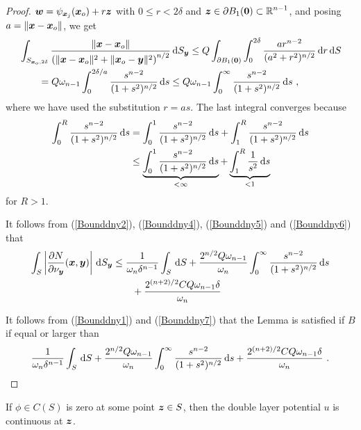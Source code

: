 \begin{proof}
${\bm{w}} = \psi_{{\bm{x}}_j}({\bm{x}}_o) + r {\bm{z}}$ with $0 \leq r < 2\delta$
and $\displaystyle {\bm{z}} \in \partial B_1({\bm{0}}) \subset \mathbb{R}^{n-1}$,
and posing $a = \|{\bm{x}}-{\bm{x}}_o\|$, we get
\begin{align}
&\int_{S_{{\bm{x}}_o,2\delta}}
\frac{\left\|{\bm{x}}-{\bm{x}}_o\right\|}
{\left(\|{\bm{x}}-{\bm{x}}_o\|^2 + \|{\bm{x}}_o-{\bm{y}}\|^2\right)^{n/2}}
\,\mathrm{d}{S}_{{\bm{y}}}
\leq Q \int_{\partial B_1({\bm{0}})} \int_0^{2\delta}
\frac{a r^{n-2}}{(a^2 + r^2)^{n/2}} \,\mathrm{d}{r} \,\mathrm{d}{S} \nonumber \\
&\qquad
= Q \omega_{n-1} \int_0^{2\delta/a} \frac{s^{n-2}}{(1 + s^2)^{n/2}} \,\mathrm{d}{s} 
\leq Q \omega_{n-1} \int_0^{\infty} \frac{s^{n-2}}{(1 + s^2)^{n/2}} \,\mathrm{d}{s} \ ,
\label{Bounddny6}
\end{align}
where we have used the substitution $r = a s$.
The last integral converges because
\begin{align*}
\int_0^R \frac{s^{n-2}}{(1 + s^2)^{n/2}} \,\mathrm{d}{s}
&= \int_0^1 \frac{s^{n-2}}{(1 + s^2)^{n/2}} \,\mathrm{d}{s}
+ \int_1^R \frac{s^{n-2}}{(1 + s^2)^{n/2}} \,\mathrm{d}{s} \\
&\leq \underbrace{\int_0^1 \frac{s^{n-2}}{(1 + s^2)^{n/2}} \,\mathrm{d}{s}}_{<\infty}
+ \underbrace{\int_1^R \frac{1}{s^2} \,\mathrm{d}{s}}_{<1}
\end{align*}
for $R >1$.

It follows from (\ref{Bounddny2}), (\ref{Bounddny4}),
(\ref{Bounddny5}) and (\ref{Bounddny6}) that
\begin{equation} \label{Bounddny7}
\begin{split}
\int_S
\left| \frac{\partial{N}}{\partial \nu_{{\bm{y}}}}({\bm{x}},{\bm{y}}) \right| \,\mathrm{d}{S}_{{\bm{y}}}
&\leq \frac{1}{\omega_n \delta^{n-1}} \int_S \,\mathrm{d}{S} 
+ \frac{2^{n/2}Q \omega_{n-1}}{\omega_n} 
\int_0^{\infty} \frac{s^{n-2}}{(1 + s^2)^{n/2}} \,\mathrm{d}{s} \\
&\qquad + \frac{2^{(n+2)/2} C Q \omega_{n-1} \delta}{\omega_n}
\end{split}
\end{equation}

 It follows from (\ref{Bounddny1}) and (\ref{Bounddny7})
that the Lemma is satisfied if $B$ if equal or larger than
\[
\frac{1}{\omega_n \delta^{n-1}} \int_S \,\mathrm{d}{S} 
+ \frac{2^{n/2}Q \omega_{n-1}}{\omega_n} 
\int_0^{\infty} \frac{s^{n-2}}{(1 + s^2)^{n/2}} \,\mathrm{d}{s}
+ \frac{2^{(n+2)/2} C Q \omega_{n-1} \delta}{\omega_n} \ . \qedhere
\]
\end{proof}

\begin{lemma} \label{pot_lem_dbl5}
If $\phi \in C(S)$ is zero at some point ${\bm{z}} \in S$, then the
double layer potential $u$ is continuous at ${\bm{z}}$.
\end{lemma}

